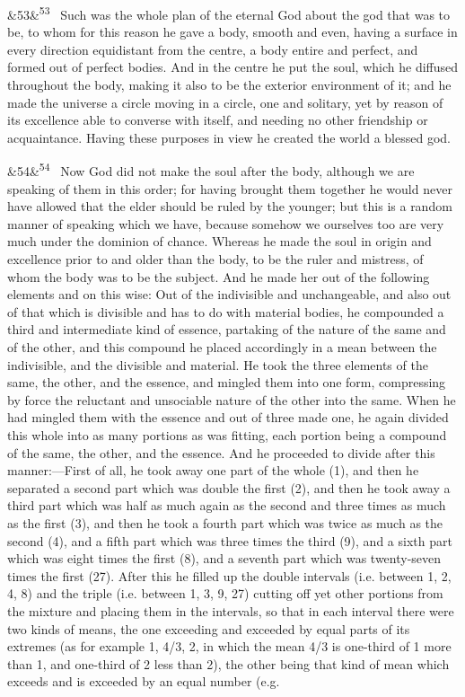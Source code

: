 \documentclass[12pt]{article}
\newcommand{\para}[1][]{\par\noindent\ifx&#1&\else\textsuperscript{\footnotesize #1}~\fi}
\begin{document}
\para[53] Such was the whole plan of the eternal God about the god that was to be, to whom for this reason he gave a body, smooth and even, having a surface in every direction equidistant from the centre, a body entire and perfect, and formed out of perfect bodies. And in the centre he put the soul, which he diffused throughout the body, making it also to be the exterior environment of it; and he made the universe a circle moving in a circle, one and solitary, yet by reason of its excellence able to converse with itself, and needing no other friendship or acquaintance. Having these purposes in view he created the world a blessed god.

\para[54] Now God did not make the soul after the body, although we are speaking of them in this order; for having brought them together he would never have allowed that the elder should be ruled by the younger; but this is a random manner of speaking which we have, because somehow we ourselves too are very much under the dominion of chance. Whereas he made the soul in origin and excellence prior to and older than the body, to be the ruler and mistress, of whom the body was to be the subject. And he made her out of the following elements and on this wise: Out of the indivisible and unchangeable, and also out of that which is divisible and has to do with material bodies, he compounded a third and intermediate kind of essence, partaking of the nature of the same and of the other, and this compound he placed accordingly in a mean between the indivisible, and the divisible and material. He took the three elements of the same, the other, and the essence, and mingled them into one form, compressing by force the reluctant and unsociable nature of the other into the same. When he had mingled them with the essence and out of three made one, he again divided this whole into as many portions as was fitting, each portion being a compound of the same, the other, and the essence. And he proceeded to divide after this manner:---First of all, he took away one part of the whole (1), and then he separated a second part which was double the first (2), and then he took away a third part which was half as much again as the second and three times as much as the first (3), and then he took a fourth part which was twice as much as the second (4), and a fifth part which was three times the third (9), and a sixth part which was eight times the first (8), and a seventh part which was twenty-seven times the first (27). After this he filled up the double intervals (i.e. between 1, 2, 4, 8) and the triple (i.e. between 1, 3, 9, 27) cutting off yet other portions from the mixture and placing them in the intervals, so that in each interval there were two kinds of means, the one exceeding and exceeded by equal parts of its extremes (as for example 1, 4/3, 2, in which the mean 4/3 is one-third of 1 more than 1, and one-third of 2 less than 2), the other being that kind of mean which exceeds and is exceeded by an equal number (e.g.
\end{document}
